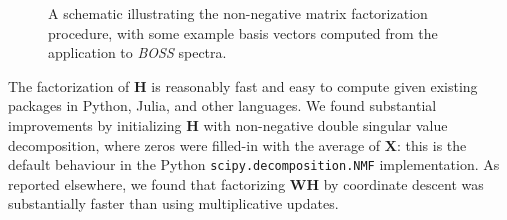 \documentclass[modern]{aastex631}
\renewcommand{\vec}[1]{\mathbf{#1}}
\newcommand{\vectheta}{\boldsymbol{\theta}}
\newcommand{\vecpsi}{\boldsymbol{\psi}}
\newcommand{\vecW}{\mathbf{W}}
\newcommand{\vecH}{\mathbf{H}}
\newcommand{\vecX}{\mathbf{X}}
\begin{document}




\begin{figure*}
    \caption{A schematic illustrating the non-negative matrix factorization procedure, with some example basis vectors computed from the application to \emph{BOSS} spectra. \label{fig:schematic}}
\end{figure*}

The factorization of $\vecH$ is reasonably fast and easy to compute given existing packages in Python, Julia, and other languages. We found substantial improvements by initializing $\vecH$ with non-negative double singular value decomposition, where zeros were filled-in with the average of $\vecX$: this is the default behaviour in the Python \texttt{scipy.decomposition.NMF} implementation. As reported elsewhere, we found that factorizing $\vecW\vecH$ by coordinate descent was substantially faster than using multiplicative updates. \\


\end{document}
